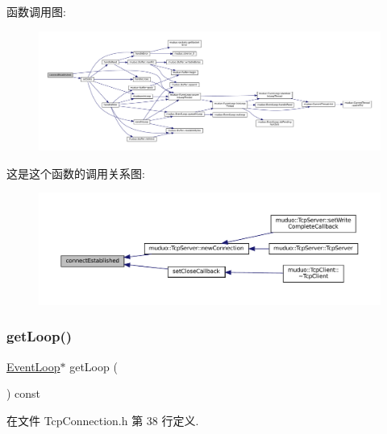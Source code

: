 函数调用图\+:
\nopagebreak
\begin{figure}[H]
\begin{center}
\leavevmode
\includegraphics[width=350pt]{classmuduo_1_1TcpConnection_a2e1f9742dac98a0c3e5a5509920934ae_cgraph}
\end{center}
\end{figure}
这是这个函数的调用关系图\+:
\nopagebreak
\begin{figure}[H]
\begin{center}
\leavevmode
\includegraphics[width=350pt]{classmuduo_1_1TcpConnection_a2e1f9742dac98a0c3e5a5509920934ae_icgraph}
\end{center}
\end{figure}
\mbox{\label{classmuduo_1_1TcpConnection_aef1cbfe0592e8196e6c81b4db82a39ce}} 
\subsubsection{\texorpdfstring{get\+Loop()}{getLoop()}}
{\footnotesize\ttfamily \hyperlink{classmuduo_1_1EventLoop}{Event\+Loop}$\ast$ get\+Loop (\begin{DoxyParamCaption}{ }\end{DoxyParamCaption}) const\hspace{0.3cm}{\ttfamily [inline]}}



在文件 Tcp\+Connection.\+h 第 38 行定义.



